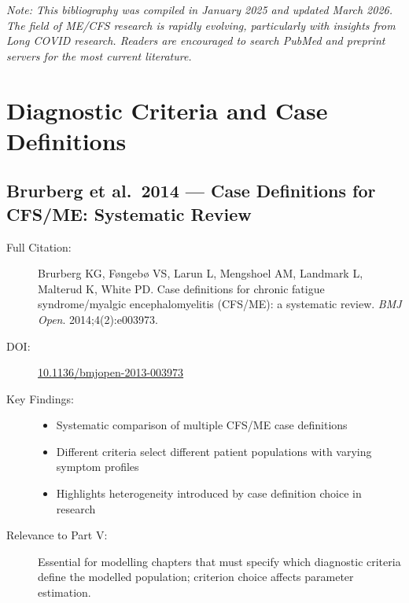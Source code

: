 \noindent\textit{Note: This bibliography was compiled in January 2025 and updated March 2026. The field of ME/CFS research is rapidly evolving, particularly with insights from Long COVID research. Readers are encouraged to search PubMed and preprint servers for the most current literature.}


\section{Diagnostic Criteria and Case Definitions}
\label{sec:bib-diagnostic-criteria-additions}

\subsection{Brurberg et al.\ 2014 --- Case Definitions for CFS/ME: Systematic Review}

\begin{description}
    \item[Full Citation:] Brurberg KG, F{\o}ngeb{\o} VS, Larun L, Mengshoel AM, Landmark L, Malterud K, White PD. Case definitions for chronic fatigue syndrome/myalgic encephalomyelitis (CFS/ME): a systematic review. \textit{BMJ Open}. 2014;4(2):e003973. \cite{Brurberg2014}
    \item[DOI:] \href{https://doi.org/10.1136/bmjopen-2013-003973}{10.1136/bmjopen-2013-003973}
    \item[Key Findings:]
    \begin{itemize}
        \item Systematic comparison of multiple CFS/ME case definitions
        \item Different criteria select different patient populations with varying symptom profiles
        \item Highlights heterogeneity introduced by case definition choice in research
    \end{itemize}
    \item[Relevance to Part V:] Essential for modelling chapters that must specify which diagnostic criteria define the modelled population; criterion choice affects parameter estimation.
\end{description}

